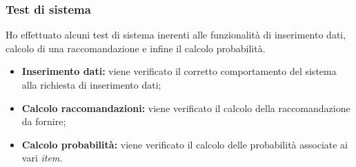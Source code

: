 \subsubsection{Test di sistema}
Ho effettuato alcuni test di sistema inerenti alle funzionalità di inserimento dati, calcolo di una raccomandazione e infine il calcolo probabilità.
\begin{itemize}
\item \textbf{Inserimento dati:} viene verificato il corretto comportamento del sistema alla richiesta di inserimento dati;
\item \textbf{Calcolo raccomandazioni:} viene verificato il calcolo della raccomandazione da fornire;
\item \textbf{Calcolo probabilità:} viene verificato il calcolo delle probabilità associate ai vari \emph{item}.
\end{itemize}
